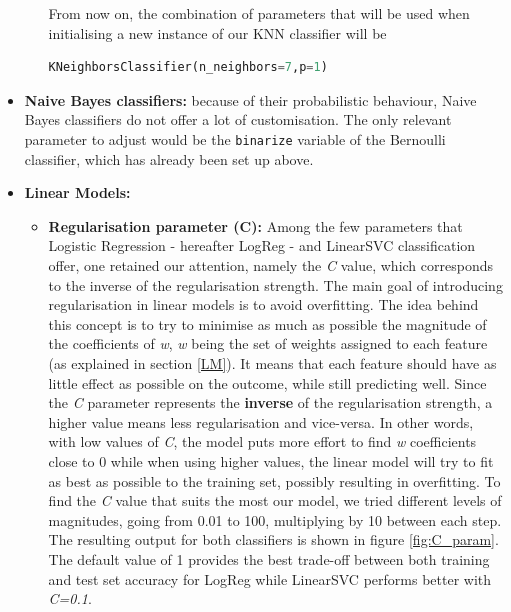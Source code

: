 \begin{itemize}
\begin{itemize}
        From now on, the combination of parameters that will be used when initialising a new instance of our KNN classifier will be
\begin{lstlisting}[language=python]
KNeighborsClassifier(n_neighbors=7,p=1)
\end{lstlisting}
    \end{itemize}
    \item \textbf{Naive Bayes classifiers:} because of their probabilistic behaviour, Naive Bayes classifiers do not offer a lot of customisation. The only relevant parameter to adjust would be the \texttt{binarize} variable of the Bernoulli classifier, which has already been set up above.
    \item \textbf{Linear Models:}
    \begin{itemize}
        \item \textbf{Regularisation parameter (C):} Among the few parameters that Logistic Regression - hereafter LogReg - and LinearSVC classification offer, one retained our attention, namely the \textit{C} value, which corresponds to the inverse of the regularisation strength. The main goal of introducing regularisation in linear models is to avoid overfitting. The idea behind this concept is to try to minimise as much as possible the magnitude of the coefficients of \textit{w}, \textit{w} being the set of weights assigned to each feature (as explained in section \ref{LM}). It means that each feature should have as little effect as possible on the outcome, while still predicting well. Since the \textit{C} parameter represents the \textbf{inverse} of the regularisation strength, a higher value means less regularisation and vice-versa. In other words, with low values of \textit{C}, the model puts more effort to find \textit{w} coefficients close to 0 while when using higher values, the linear model will try to fit as best as possible to the training set, possibly resulting in overfitting.
    To find the \textit{C} value that suits the most our model, we tried different levels of magnitudes, going from 0.01 to 100, multiplying by 10 between each step. The resulting output for both classifiers is shown in figure \ref{fig:C_param}. The default value of 1 provides the best trade-off between both training and test set accuracy for LogReg while LinearSVC performs better with \textit{C=0.1}.
    \begin{figure}[ht]
    \centering
        \begin{minipage}[b]{0.45\textwidth}

\end{minipage}
\end{figure}
\end{itemize}
\end{itemize}
